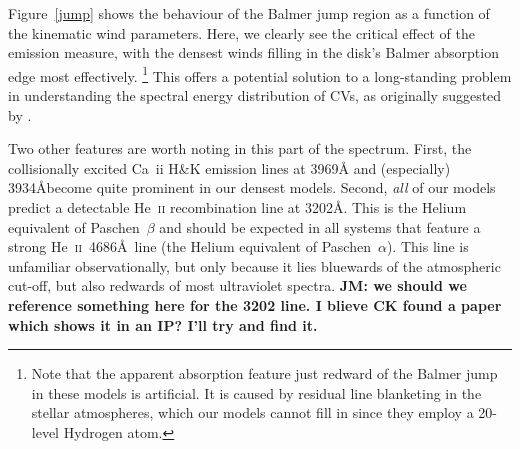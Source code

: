 \documentclass[preprint, a4paper, 11pt]{aastex}
\begin{document}
Figure~\ref{jump} shows the behaviour of the Balmer jump region as a
function of the kinematic wind parameters. Here, we clearly see the
critical effect of the emission measure, with the densest winds
filling in the disk's Balmer absorption edge most effectively.
\footnote{Note that the apparent absorption feature 
just redward of the Balmer jump in these models is artificial. It is
caused by residual line blanketing in the stellar atmospheres, which
our models cannot fill in since they employ a 20-level Hydrogen atom.}
This offers a potential solution to a long-standing problem in
understanding the spectral energy distribution of CVs, as
originally suggested by \cite{KLWB98}. 

Two other features are worth noting in this part of the
spectrum. First, the collisionally excited Ca~{\sc ii} H\&K 
emission lines at 3969\AA 
and (especially) 3934\AA become quite prominent in our densest
models. Second, {\em all} of our models predict a detectable
He~\textsc{ii} recombination line at 3202\AA. This is the Helium
equivalent of Paschen~$\beta$ and should be expected in all systems that
feature a strong He~\textsc{ii}~4686\AA\ line (the Helium
equivalent of Paschen~$\alpha$). This line is unfamiliar observationally,
but only because it lies bluewards of the atmospheric cut-off, but
also redwards of most ultraviolet spectra. 
{\bf JM: we should we reference something here for the 3202 line. 
I blieve CK found a paper which shows it in an IP? I'll try and find it.}
\end{document}

